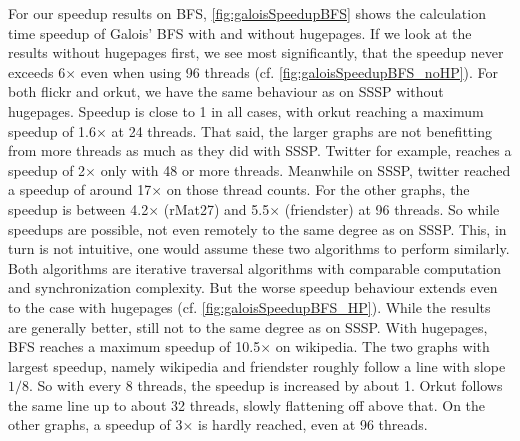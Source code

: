 For our speedup results on BFS, \autoref{fig:galoisSpeedupBFS} shows the calculation time speedup of Galois' BFS with and without hugepages.
If we look at the results without hugepages first, we see most significantly, that the speedup never exceeds 6$\times$ even when using 96 threads (cf. \autoref{fig:galoisSpeedupBFS_noHP}).
For both flickr and orkut, we have the same behaviour as on SSSP without hugepages. Speedup is close to 1 in all cases, with orkut reaching a maximum speedup of 1.6$\times$ at 24 threads.
That said, the larger graphs are not benefitting from more threads as much as they did with SSSP. Twitter for example, reaches a speedup of 2$\times$ only with 48 or more threads. Meanwhile on SSSP, twitter reached a speedup of around 17$\times$ on those thread counts.
For the other graphs, the speedup is between 4.2$\times$ (rMat27) and 5.5$\times$ (friendster) at 96 threads. So while speedups are possible, not even remotely to the same degree as on SSSP. This, in turn is not intuitive, one would assume these two algorithms to perform similarly. Both algorithms are iterative traversal algorithms with comparable computation and synchronization complexity. But the worse speedup behaviour extends even to the case with hugepages (cf. \autoref{fig:galoisSpeedupBFS_HP}). While the results are generally better, still not to the same degree as on SSSP. With hugepages, BFS reaches a maximum speedup of 10.5$\times$ on wikipedia. The two graphs with largest speedup, namely wikipedia and friendster roughly follow a line with slope $1/8$. So with every 8 threads, the speedup is increased by about 1. Orkut follows the same line up to about 32 threads, slowly flattening off above that.
On the other graphs, a speedup of 3$\times$ is hardly reached, even at 96 threads.



